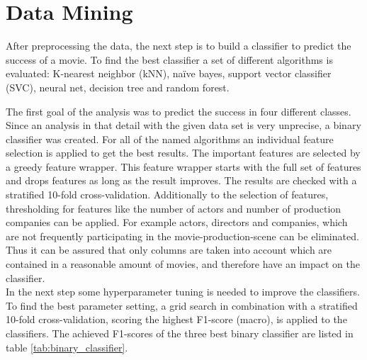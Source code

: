 \chapter{Data Mining}
\label{cha:data_mining}

After preprocessing the data, the next step is to build a classifier to predict the success of a movie. To find the best classifier a set of different algorithms is evaluated:
K-nearest neighbor (kNN), 
na\"{i}ve bayes, 
support vector classifier (SVC), 
neural net, 
decision tree and 
random forest.

The first goal of the analysis was to predict the success in four different classes. Since an analysis in that detail with the given data set is very unprecise, a binary classifier was created.
For all of the named algorithms an individual feature selection is applied to get the best results. The important features are selected by a greedy feature wrapper. This feature wrapper starts with the full set of features and drops features as long as the result improves. The results are checked with a stratified 10-fold cross-validation. Additionally to the selection of features, thresholding for features like the number of actors and number of production companies can be applied. For example actors, directors and companies, which are not frequently participating in the movie-production-scene can be eliminated. Thus it can be assured that only columns are taken into account which are contained in a reasonable amount of movies, and therefore have an impact on the classifier. \\
In the next step some hyperparameter tuning is needed to improve the classifiers. To find the best parameter setting, a grid search in combination with a stratified 10-fold cross-validation, scoring the highest F1-score (macro), is applied to the classifiers.
The achieved F1-scores of the three best binary classifier are listed in table \ref{tab:binary_classifier}. 

